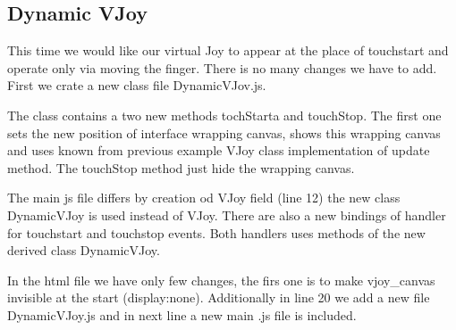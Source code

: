 \subsection{Dynamic VJoy}
This time we would like our virtual Joy to appear at the place of touchstart and operate only via moving the finger. There is no many changes we have to add. First we crate a new class file DynamicVJov.js.


\begin{explain}
The class contains a two new methods tochStarta and touchStop. The first one sets the new position of interface wrapping canvas, shows this wrapping canvas and uses known from previous example VJoy class implementation of update method. The touchStop method just hide the wrapping canvas.
\end{explain}


\begin{explain}
The main js file differs by creation od VJoy field (line 12) the new class DynamicVJoy is used instead of VJoy. There are also a new bindings of handler for touchstart and touchstop events. Both handlers uses methods of the new derived class DynamicVJoy.
\end{explain}


\begin{explain}
In the html file we have only few changes, the firs one is to make vjoy\_canvas invisible at the start (display:none). Additionally in line 20 we add a new file DynamicVJoy.js and in next line a new main .js file is included.
\end{explain}

